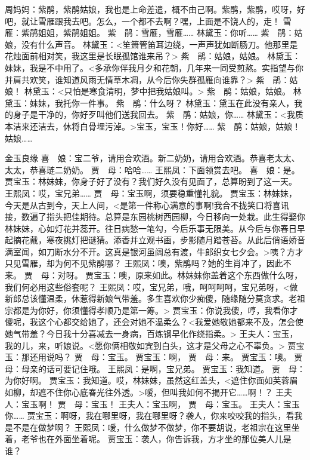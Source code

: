 \documentclass{article}
\begin{document}
周妈妈：紫鹃，紫鹃姑娘，我也是上命差遣，概不由己啊。紫鹃，紫鹃，哎呀，好吧，就让雪雁跟我去吧。怎么，一个都不去啊？嘿，上面是不饶人的，走！
雪　雁：紫鹃姐姐，紫鹃姐姐。
紫　鹃：雪雁，雪雁……
林黛玉：你听……
紫　鹃：姑娘，没有什么声音。
林黛玉：<笙箫管笛耳边绕，一声声犹如断肠刀。他那里是花烛面前相对笑，我这里是长眠孤馆谁来吊？>
紫　鹃：姑娘，姑娘。
林黛玉：妹妹，我是不中用了。<多承你伴我月夕和花朝，几年来一同受煎熬。实指望与你并肩共欢笑，谁知道风雨无情草木凋，从今后你失群孤雁向谁靠？>
紫　鹃：姑娘！
林黛玉：<只怕是寒食清明，梦中把我姑娘叫。>
紫　鹃：姑娘，姑娘。
林黛玉：妹妹，我托你一件事。
紫　鹃：什么呀？
林黛玉：黛玉在此没有亲人，我的身子是干净的，你好歹叫他们送我回去。
紫　鹃：姑娘，你……
林黛玉：<我质本洁来还洁去，休将白骨埋污淖。>宝玉，宝玉！你好……
紫　鹃：姑娘，姑娘！姑娘……

金玉良缘
喜　娘：宝二爷，请用合欢酒。新二奶奶，请用合欢酒。恭喜老太太、太太，恭喜琏二奶奶。
贾　母：哈哈……
王熙凤：下面领赏去吧。
喜　娘：是。
贾宝玉：林妹妹，你身子好了没有？我们好久没有见面了，总算盼到了这一天。
王熙凤：哎，宝兄弟……
贾　母：宝玉啊，须要稳重懂礼貌。
贾宝玉：林妹妹，今天是从古到今，天上人间，<是第一件称心满意的事啊!我合不拢笑口将喜讯接，数遍了指头把佳期待。总算是东园桃树西园柳，今日移向一处栽。此生得娶你林妹妹，心如灯花并蕊开。往日病愁一笔勾，今后乐事无限美。从今后与你春日早起摘花戴，寒夜挑灯把谜猜。添香并立观书画，步影随月踏苍苔。从此后俏语娇音满室闻，如刀断水分不开。这真是银河虽阔总有渡，牛郎织女七夕会。>咦？方才只见雪雁，却为何不见紫鹃哪？
王熙凤：噢，紫鹃吗？她的生肖冲了，因此不来。
贾　母：对呀。
贾宝玉：噢，原来如此。林妹妹你盖着这个东西做什么呀，我们何必用这些俗套呢？
王熙凤：哎，宝兄弟，哦，呵呵呵呵，宝兄弟呀，<做新郎总该懂温柔，休惹得新娘气带羞。多生喜欢你少痴傻，随缘随分莫贪求。老祖宗都是为你好，你须懂得孝顺乃是第一筹。>
贾宝玉：你说我傻，哼，我看你才傻呢，我这个心都交给她了，还会对她不温柔么？<我爱她敬她都来不及，怎会使她气带羞？今日我十分喜减去一身病，百炼钢早化作绕指柔。>
王夫人：宝玉，我的儿，来，听娘说。<愿你俩相敬如宾到白头，这才是父母之心不辜负。>
贾宝玉：那还用说吗？
贾　母：宝玉。
贾宝玉：啊，
贾　母：来。
贾宝玉：噢。
贾　母：母亲的话可要记住哦。
王熙凤：是啊，宝兄弟。
贾宝玉：我知道。
贾　母：为你好啊。
贾宝玉：我知道。哎，林妹妹，虽然这红盖头，<遮住你面如芙蓉眉如柳，却遮不住你心底春光往外透。>嗳，但叫我如何不揭开它……啊！？
王夫人：宝玉啊！
贾　母：宝玉！
王夫人：宝玉啊，
贾　母：宝玉。
王夫人：宝玉你……
贾宝玉：啊呀，我在哪里呀，我在哪里呀？袭人，你来咬咬我的指头，看我是不是在做梦啊？
王熙凤：嗳，什么做梦不做梦，你不要胡说，老祖宗在这里坐着，老爷也在外面坐着呢。
贾宝玉：袭人，你告诉我，方才坐的那位美人儿是谁？
\end{document}

